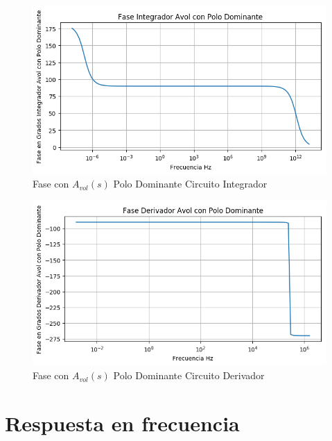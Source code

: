 \documentclass[a4paper]{article}
\begin{document}
\begin{figure}[H]
	\centering
	\includegraphics[width=\textwidth]{Ejercicio4/BODE-AVOLW-FASE-INTEGRADO}
	\caption{Fase con $A_{vol}(s)$ Polo Dominante Circuito Integrador}
\end{figure}


\begin{figure}[H]
	\centering
	\includegraphics[width=\textwidth]{Ejercicio4/BODE-AVOLW-FASE-DERIVADOR}
	\caption{Fase con $A_{vol}(s)$ Polo Dominante Circuito Derivador}
\end{figure}

\section{Respuesta en frecuencia}
\end{document}
